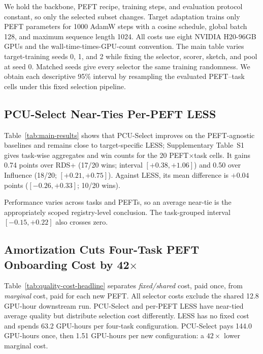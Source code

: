 We hold the backbone, PEFT recipe, training steps, and evaluation protocol constant, so only the selected subset changes. Target adaptation trains only PEFT parameters for 1000 AdamW steps with a cosine schedule, global batch 128, and maximum sequence length 1024. All costs use eight NVIDIA H20-96GB GPUs and the wall-time-times-GPU-count convention. The main table varies target-training seeds 0, 1, and 2 while fixing the selector, scorer, sketch, and pool at seed 0. Matched seeds give every selector the same training randomness. We obtain each descriptive 95\% interval by resampling the evaluated PEFT--task cells under this fixed selection pipeline.

\subsection{PCU-Select Near-Ties Per-PEFT LESS}
\label{sec:quality}



Table~\ref{tab:main-results} shows that PCU-Select improves on the PEFT-agnostic baselines and remains close to target-specific LESS; Supplementary Table~S1 gives task-wise aggregates and win counts for the 20 PEFT$\times$task cells. It gains 0.74 points over RDS+ (17/20 wins; interval $[+0.38,+1.06]$) and 0.50 over Influence (18/20; $[+0.21,+0.75]$). Against LESS, its mean difference is $+0.04$ points ($[-0.26,+0.33]$; 10/20 wins).

Performance varies across tasks and PEFTs, so an average near-tie is the appropriately scoped registry-level conclusion. The task-grouped interval $[-0.15,+0.22]$ also crosses zero.

\subsection{Amortization Cuts Four-Task PEFT Onboarding Cost by 42$\times$}
\label{sec:reuse}



Table~\ref{tab:quality-cost-headline} separates \emph{fixed/shared} cost, paid once, from \emph{marginal} cost, paid for each new PEFT. All selector costs exclude the shared 12.8 GPU-hour downstream run. PCU-Select and per-PEFT LESS have near-tied average quality but distribute selection cost differently. LESS has no fixed cost and spends 63.2 GPU-hours per four-task configuration. PCU-Select pays 144.0 GPU-hours once, then 1.51 GPU-hours per new configuration: a $42\times$ lower marginal cost.

